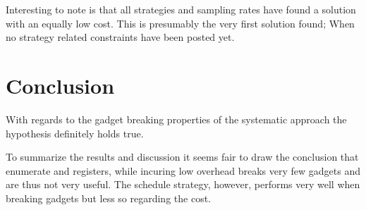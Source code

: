 Interesting to note is that all strategies and sampling rates have found a solution with
an equally low cost. This is presumably the very first solution found; When no strategy
related constraints have been posted yet.



\section{Conclusion}

With regards to the gadget breaking properties of the systematic approach the hypothesis
definitely holds true.

To summarize the results and discussion it seems fair to draw the conclusion that enumerate
and registers, while incuring low overhead breaks very few gadgets and are thus not very
useful. The schedule strategy, however, performs very well when breaking gadgets but less
so regarding the cost.

